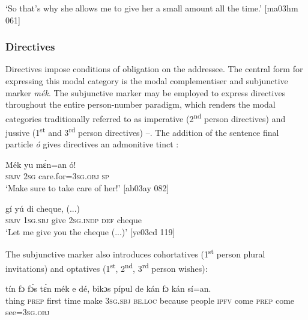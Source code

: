 \glt ‘So that’s why she allows me to give her a small amount all the time.’ [ma03hm 061]
\z

\subsubsection{Directives}\label{sec:6.7.3.3}

Directives impose conditions of obligation on the addressee. The central form for expressing this modal category is the modal complementiser and subjunctive marker \textit{mék}. The subjunctive marker may be employed to express directives throughout the entire person-number paradigm, which renders the modal categories traditionally referred to as imperative (2\textsuperscript{nd} person directives)  and jussive (1\textsuperscript{st} and 3\textsuperscript{rd} person directives) –. The addition of the sentence final particle \textit{ó} gives directives an admonitive tinct :


\ea%
    \label{ex:key:428}
    \gll Mék    yu  mɛ́n=an      ó!\\
\textsc{sbjv}    \textsc{2sg}  care.for=\textsc{3sg.obj}  \textsc{sp}\\

\glt ‘Make sure to take care of her!’ [ab03ay 082]
\z


\ea%
    \label{ex:key:429}
    \gll {}     gí    yú    di  cheque, (...)\\
\textsc{sbjv}    \textsc{1sg.sbj}  give    \textsc{2sg.indp}  \textsc{def}  cheque\\

\glt ‘Let me give you the cheque (...)’ [ye03cd 119]
\z

The subjunctive marker also introduces cohortatives (1\textsuperscript{st} person plural invitations)  and optatives (1\textsuperscript{st}, 2\textsuperscript{nd}, 3\textsuperscript{rd} person wishes):


\ea%
    \label{ex:key:430}
    \gll tín    fɔ  fɔ́s  tɛ́n    mék    e    dé,    bikɔs  pípul
de    kán    fɔ  kán    sí=an.\\
thing  \textsc{prep}  first time  make  \textsc{3sg.sbj}  \textsc{be.loc}  because  people
\textsc{ipfv}    come  \textsc{prep}  come  see=\textsc{3sg.obj}\\

